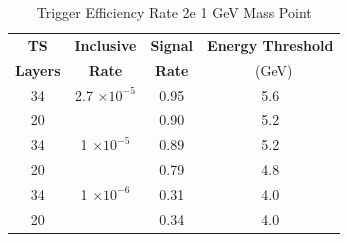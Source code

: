 \begin{table}
 \centering
\caption{Trigger Efficiency Rate 2e 1 GeV Mass Point}
\begin{tabular}{ c | c | c | c }
\textbf{TS} & \textbf{Inclusive} & \textbf{Signal} & \textbf{Energy Threshold}  \\ \textbf{Layers} & \textbf{Rate} & \textbf{Rate} & \ (GeV) \\ 
\hline
34 & 2.7 $\times 10^{-5}$ & 0.95 & 5.6 \\ 
20 & & 0.90 & 5.2 \\ 
\hline 
34 & 1 $\times 10^{-5}$ & 0.89 & 5.2 \\ 
20 & & 0.79 & 4.8 \\ 
\hline 
34 & 1 $\times 10^{-6}$ & 0.31 & 4.0 \\ 
20 & & 0.34 & 4.0 \\ 
\hline 
\end{tabular}
\end{table}
